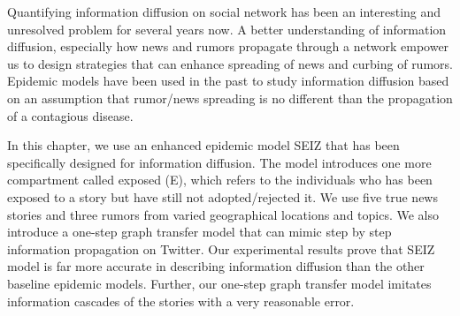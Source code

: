Quantifying information diffusion on social network has been an interesting and unresolved problem for several years now. A better understanding of information diffusion, especially how news and rumors propagate through a network empower us to design strategies that can enhance spreading of news and curbing of rumors. Epidemic models have been used in the past to study information diffusion based on an assumption that rumor/news spreading is no different than the propagation of a contagious disease.

In this chapter, we use an enhanced epidemic model SEIZ that has been specifically designed for information diffusion. The model introduces one more compartment called exposed (E), which refers to the individuals who has been exposed to a story but have still not adopted/rejected it. We use five true news stories and three rumors from varied geographical locations and topics. We also introduce a one-step graph transfer model that can mimic step by step information propagation on Twitter. Our experimental results prove that SEIZ model is far more accurate in describing information diffusion than the other baseline epidemic models. Further, our one-step graph transfer model imitates information cascades of the stories with a very reasonable error. 

%

